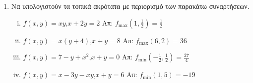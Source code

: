 \begin{enumerate}
  \item Να υπολογιστούν τα τοπικά ακρότατα με περιορισμό των παρακάτω συναρτήσεων.

    \begin{enumerate}[i)]
      \item $ f(x,y) = xy $,\quad $ x+2y = 2 $ \hfill Απ: 
        $ f_{\text{max}}(1, \frac{1}{2}) = \frac{1}{2}  $

      \item $ f(x,y) = x(y+4) $,\quad $ x+y=8 $ \hfill Απ: 
        $ f_{\text{max}}(6,2) = 36 $

      \item $ f(x,y) = 7-y+x^{2} $,\quad $ x+y=0 $ \hfill Απ: 
        $ f_{\text{min}}(- \frac{1}{2}, \frac{1}{2}) = \frac{27}{4}  $

      \item $ f(x,y) = x - 3y -xy $,\quad $ x+y=6 $ \hfill Απ: 
        $ f_{\text{min}}(1,5) = -19 $
    \end{enumerate}

\end{enumerate}


